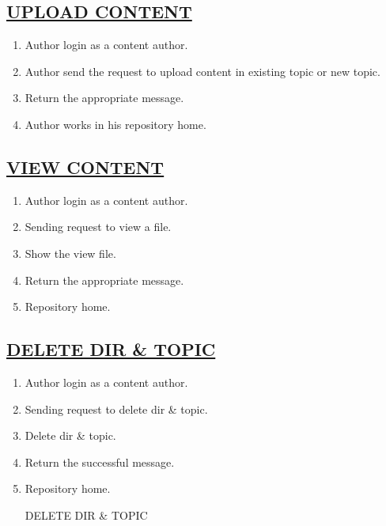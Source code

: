\documentclass{article}
\begin{document}
\subsection*{\underline{UPLOAD CONTENT}}

  \begin{enumerate}
                                \item Author login as a content author.
                                   \item Author send the request to upload content in existing topic or new topic.
                                     \item Return the appropriate message.
                                     \item Author works in his repository home.
\begin{center}

\label{figure:Uploadcon_rep.latex}
\end{center}
\end{enumerate} 
\subsection*{\underline{VIEW CONTENT}}
\begin{enumerate}

                                  \item Author login as a content author.
                                       \item Sending request to view a file.
                                          \item Show the view file.
                                             \item Return the appropriate message.
                                                \item Repository home.
\begin{center}

\label{figure:viewcon_rep.latex}
\end{center}
\end{enumerate}
\subsection*{\underline{DELETE DIR \& TOPIC}}
\begin{enumerate}
                          \item Author login as a content author.
                            \item Sending request to delete dir \& topic.
                              \item Delete dir \& topic.
                                \item Return the successful message.
                                   \item Repository home.  

\begin{center}

{DELETE DIR \& TOPIC}
\label{figure:deletedir_rep.latex}
\end{center}
\end{enumerate}
\end{document}
